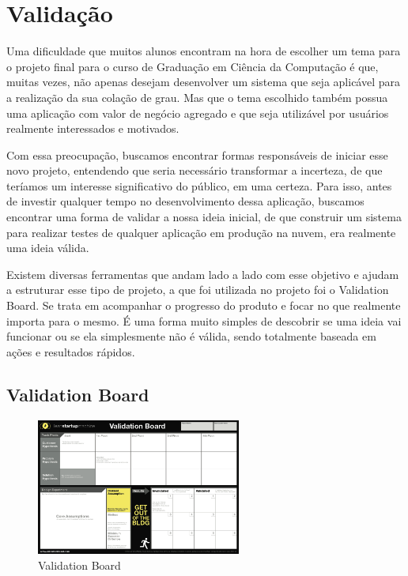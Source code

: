 \chapter{Validação}\label{chp:LABEL_CHP_2}

Uma dificuldade que muitos alunos encontram na hora de escolher um tema para o projeto final para o curso de Graduação em Ciência da Computação é que, muitas vezes, não apenas desejam desenvolver um sistema que seja aplicável para a realização da sua colação de grau. Mas que o tema escolhido também possua uma aplicação com valor de negócio agregado e que seja utilizável por usuários realmente interessados e motivados.

Com essa preocupação, buscamos encontrar formas responsáveis de iniciar esse novo projeto, entendendo que seria necessário transformar a incerteza, de que teríamos um interesse significativo do público, em uma certeza. Para isso, antes de investir qualquer tempo no desenvolvimento dessa aplicação, buscamos encontrar uma forma de validar a nossa ideia inicial, de que construir um sistema para realizar testes de qualquer aplicação em produção na nuvem, era realmente uma ideia válida.

Existem diversas ferramentas que andam lado a lado com esse objetivo e ajudam a estruturar esse tipo de projeto, a que foi utilizada no projeto foi o Validation Board\cite{art:REF_ART_1}. Se trata em acompanhar o progresso do produto e focar no que realmente importa para o mesmo. É uma forma muito simples de descobrir se uma ideia vai funcionar ou se ela simplesmente não é válida, sendo totalmente baseada em ações e resultados rápidos.

\section{Validation Board}\label{sec:LABEL_CHP_2_SEC_A}

\begin{figure}
  \centering
  \includegraphics[width=0.6\textwidth]{imagens/validationTemplate.png}
  \caption{Validation Board}
  \label{fig:LABEL_FIG_1}
\end{figure}

